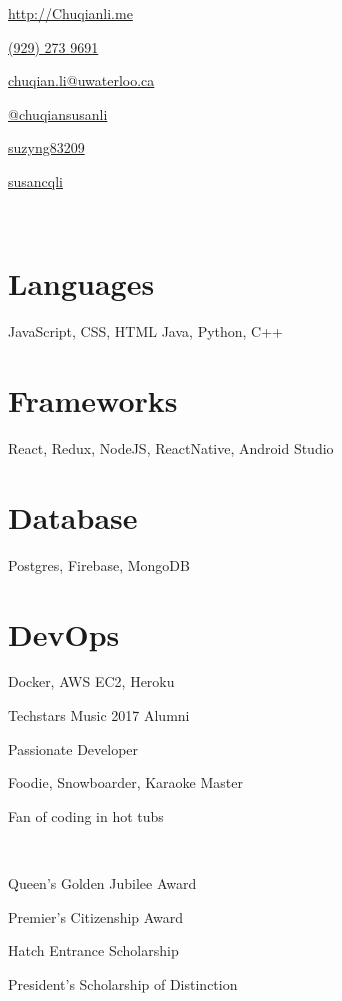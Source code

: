\documentclass[]{friggeri-cv}
\begin{document}
       {\href{http://chuqianli.me}{http://Chuqianli.me}}


\begin{aside}
  \begin{description}\raggedleft
	  \item \href{tel:19292739691}{(929) 273 9691 \faPhone}
	  \item \href{mailto:chuqian.li@edu.uwaterloo.ca}{chuqian.li@uwaterloo.ca \faEnvelopeO}
	  \item \href{https://medium.com/@chuqiansusanli}{@chuqiansusanli \faMedium}
	  \item \href{https://github.com/suzyng83209}{suzyng83209 \faGithub}
	  \item \href{https://www.linkedin.com/in/susancqli}{susancqli \faLinkedin}
  \end{description}
  \
  \supersection{}
  \
  \supersection{}
  \
  \section{Languages}
  JavaScript, CSS, HTML
  Java, Python, C++
  \section{Frameworks}
  React, Redux, NodeJS, ReactNative, Android Studio
  \section{Database}
  Postgres, Firebase, MongoDB
  \section{DevOps}
  Docker, AWS EC2, Heroku
  \
  \supersection{}
  \
  \begin{description}\raggedleft
  	\item Techstars Music 2017 Alumni
  	\item Passionate Developer
  	\item Foodie, Snowboarder, Karaoke Master
  	\item Fan of coding in hot tubs
  \end{description}
	\
	\supersection{}
	\
	\begin{description}\raggedleft
		\item Queen's Golden Jubilee Award
		\item Premier's Citizenship Award
		\item Hatch Entrance Scholarship
		\item President's Scholarship of Distinction
	\end{description}
\end{aside}
\end{document}
